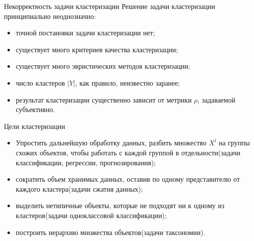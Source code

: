 \documentclass[unicode, notheorems, pdf]{beamer}
\begin{document}
\begin{frame}{Некорректность задачи кластеризации}
	Решение задачи кластеризации принципиально неоднозначно:
	\vspace{0.25cm}
	\begin{itemize}
		\item точной постановки задачи кластеризации нет;
		\vspace{0.5cm}
		\item существует много критериев качества кластеризации;
		\vspace{0.5cm}
		\item существует много эвристических методов кластеризации;
		\vspace{0.5cm}
		\item число кластеров $|Y|$, как правило, неизвестно заранее;
		\vspace{0.5cm}
		\item результат кластеризации существенно зависит от метрики $\rho$, задаваемой субъективно.
	\end{itemize}
\end{frame}

\begin{frame}{Цели кластеризации}
	\begin{itemize}
		\item Упростить дальнейшую обработку данных, разбить множество $X^l$ на группы схожих объектов, чтобы работать с каждой группой в отдельности\newline(задачи классификации, регрессии, прогнозирования);
		\vspace{0.25cm}
		\item сократить объем хранимых данных, оставив по одному представителю от каждого кластера\newline(задачи сжатия данных);
		\vspace{0.25cm}
		\item выделить нетипичные объекты, которые не подходят ни к одному из кластеров\newline(задачи одноклассовой классификации);
		\vspace{0.25cm}
		\item построить иерархию множества объектов\newline(задачи таксономии).
	\end{itemize}
\end{frame}
\end{document}
